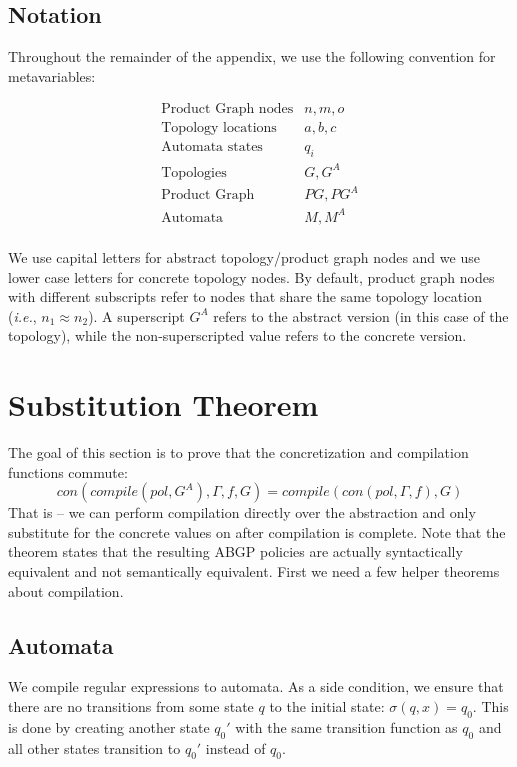 \documentclass[twocolumn, openany]{sig-alternate-10pt}
\newcommand{\IE}{\emph{i.e.}}
\begin{document}
\subsection{Notation}

Throughout the remainder of the appendix, we use the following convention for metavariables:

\[ \begin{array}{ll}
  \text{Product Graph nodes} & n,m,o \\
  \text{Topology locations} & a,b,c \\
  \text{Automata states} & q_i \\
  \text{Topologies} & G, G^A \\
  \text{Product Graph} & PG, PG^A \\
  \text{Automata} & M, M^A \\
\end{array} \]

We use capital letters for abstract topology/product graph nodes and we use lower case letters for concrete topology nodes. By default, product graph nodes with different subscripts refer to nodes that share the same topology location (\IE, $n_1 \approx n_2$). A superscript $G^A$ refers to the abstract version (in this case of the topology), while the non-superscripted value refers to the concrete version.


\section{Substitution Theorem}

The goal of this section is to prove that the concretization and compilation functions commute: 
$$con(compile(pol,G^A),\Gamma,f,G) = compile(con(pol,\Gamma,f), G)$$ 
That is -- we can perform compilation directly over the abstraction and only substitute for the concrete values on after compilation is complete. Note that the theorem states that the resulting ABGP policies are actually syntactically equivalent and not semantically equivalent. First we need a few helper theorems about compilation.

\subsection{Automata}

\newcommand{\Lang}{\ensuremath{\mathcal{L}}}

We compile regular expressions to automata. As a side condition, we ensure that there are no transitions from some state $q$ to the initial state: $\sigma(q,x) = q_0$. This is done by creating another state $q_0'$ with the same transition function as $q_0$ and all other states transition to $q_0'$ instead of $q_0$.
\end{document}
